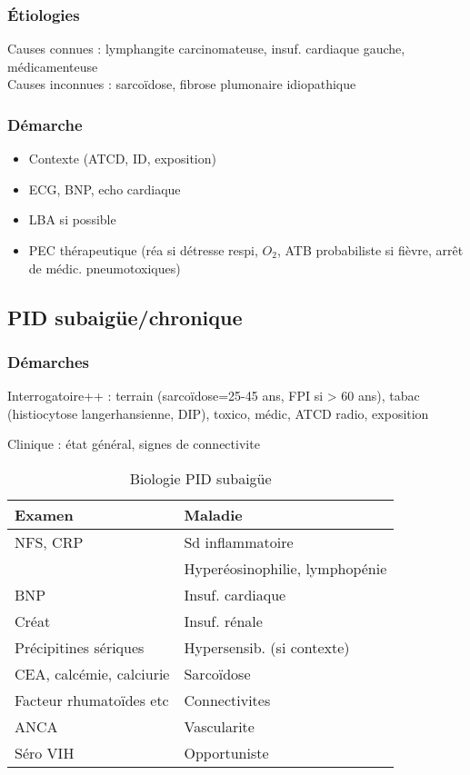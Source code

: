 \subsubsection{Étiologies}
Causes connues : lymphangite carcinomateuse, insuf. cardiaque gauche, médicamenteuse\\
Causes inconnues : sarcoïdose, fibrose plumonaire idiopathique
\subsubsection{Démarche}
\begin{itemize}
\item Contexte (ATCD, ID, exposition)
\item ECG, BNP, echo cardiaque
\item LBA si possible
\item PEC thérapeutique (réa si détresse respi, \(O_2\), ATB probabiliste si fièvre, arrêt de médic. pneumotoxiques)
\end{itemize}

\subsection{PID subaigüe/chronique}
\subsubsection{Démarches}
Interrogatoire++ : terrain (sarcoïdose=25-45 ans, \gls{FPI} si > 60 ans), tabac (histiocytose langerhansienne, \gls{DIP}), toxico, médic, ATCD radio, exposition

Clinique : état général, signes de connectivite

\begin{table}[htbp]
  \caption{Biologie PID subaigüe}
  \centering
  \begin{tabular}{ll}
    \toprule
    Examen & Maladie\\
    \midrule
    NFS, CRP & Sd inflammatoire\\
           & Hyperéosinophilie, lymphopénie\\
    BNP & Insuf. cardiaque\\
    Créat & Insuf. rénale\\
    Précipitines sériques & Hypersensib. (si contexte)\\
    CEA, calcémie, calciurie & Sarcoïdose\\
    Facteur rhumatoïdes etc & Connectivites\\
    ANCA & Vascularite\\
    Séro VIH & Opportuniste\\
    \bottomrule
  \end{tabular}
\end{table}


